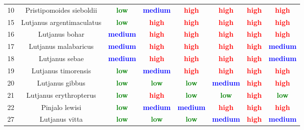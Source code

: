 \documentclass{report}\usepackage[]{graphicx}\usepackage[]{color}
\begin{document}
\begin{table}[ht]
{\begin{tabular}{cccccccc}
   10 & Pristipomoides sieboldii & \textcolor{green}{\textbf{low}} & \textcolor{blue}{\textbf{medium}} & \textcolor{red}{\textbf{high}} & \textcolor{red}{\textbf{high}} & \textcolor{red}{\textbf{high}} & \textcolor{red}{\textbf{high}} \\ 
   15 & Lutjanus argentimaculatus & \textcolor{green}{\textbf{low}} & \textcolor{red}{\textbf{high}} & \textcolor{red}{\textbf{high}} & \textcolor{red}{\textbf{high}} & \textcolor{red}{\textbf{high}} & \textcolor{red}{\textbf{high}} \\ 
   16 & Lutjanus bohar & \textcolor{blue}{\textbf{medium}} & \textcolor{red}{\textbf{high}} & \textcolor{red}{\textbf{high}} & \textcolor{red}{\textbf{high}} & \textcolor{red}{\textbf{high}} & \textcolor{red}{\textbf{high}} \\ 
   17 & Lutjanus malabaricus & \textcolor{blue}{\textbf{medium}} & \textcolor{red}{\textbf{high}} & \textcolor{red}{\textbf{high}} & \textcolor{red}{\textbf{high}} & \textcolor{red}{\textbf{high}} & \textcolor{blue}{\textbf{medium}} \\ 
   18 & Lutjanus sebae & \textcolor{blue}{\textbf{medium}} & \textcolor{red}{\textbf{high}} & \textcolor{red}{\textbf{high}} & \textcolor{red}{\textbf{high}} & \textcolor{red}{\textbf{high}} & \textcolor{blue}{\textbf{medium}} \\ 
   19 & Lutjanus timorensis & \textcolor{green}{\textbf{low}} & \textcolor{blue}{\textbf{medium}} & \textcolor{red}{\textbf{high}} & \textcolor{red}{\textbf{high}} & \textcolor{red}{\textbf{high}} & \textcolor{red}{\textbf{high}} \\ 
   20 & Lutjanus gibbus & \textcolor{green}{\textbf{low}} & \textcolor{green}{\textbf{low}} & \textcolor{green}{\textbf{low}} & \textcolor{blue}{\textbf{medium}} & \textcolor{red}{\textbf{high}} & \textcolor{red}{\textbf{high}} \\ 
   21 & Lutjanus erythropterus & \textcolor{green}{\textbf{low}} & \textcolor{red}{\textbf{high}} & \textcolor{green}{\textbf{low}} & \textcolor{green}{\textbf{low}} & \textcolor{red}{\textbf{high}} & \textcolor{green}{\textbf{low}} \\ 
   22 & Pinjalo lewisi & \textcolor{green}{\textbf{low}} & \textcolor{blue}{\textbf{medium}} & \textcolor{blue}{\textbf{medium}} & \textcolor{red}{\textbf{high}} & \textcolor{red}{\textbf{high}} & \textcolor{red}{\textbf{high}} \\ 
   27 & Lutjanus vitta & \textcolor{green}{\textbf{low}} & \textcolor{green}{\textbf{low}} & \textcolor{green}{\textbf{low}} & \textcolor{blue}{\textbf{medium}} & \textcolor{red}{\textbf{high}} & \textcolor{blue}{\textbf{medium}} \\ 

\end{tabular}}
\end{table}
\end{document}
